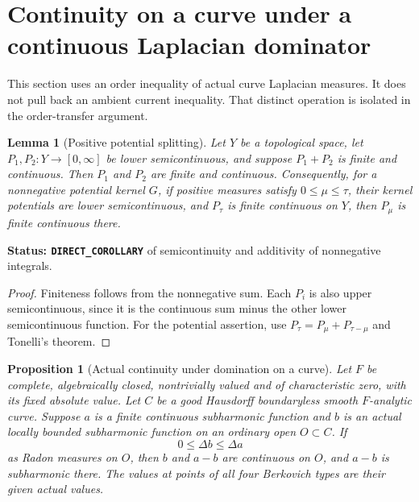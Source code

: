 \documentclass[11pt,a4paper]{article}
\numberwithin{equation}{section}
\newtheorem{lemma}[theorem]{Lemma}
\newtheorem{proposition}[theorem]{Proposition}
\theoremstyle{definition}
\theoremstyle{remark}
\begin{document}


\section{Continuity on a curve under a continuous Laplacian dominator}
\label{sec:r6-curve-order-continuity}

This section uses an order inequality of actual curve Laplacian
measures. It does not pull back an ambient current inequality.
That distinct operation is isolated in the order-transfer argument.

\begin{lemma}[Positive potential splitting]
\label{lem:r6-positive-potential-splitting}
Let $Y$ be a topological space, let $P_1,P_2:Y\to[0,\infty]$
be lower semicontinuous, and suppose $P_1+P_2$ is finite and
continuous. Then $P_1$ and $P_2$ are finite and continuous.
Consequently, for a nonnegative potential kernel $G$, if positive
measures satisfy $0\le\mu\le\tau$, their kernel potentials are
lower semicontinuous, and $P_\tau$ is finite continuous on $Y$,
then $P_\mu$ is finite continuous there.
\end{lemma}

\noindent\textbf{Status: \texttt{DIRECT\_COROLLARY}} of
semicontinuity and additivity of nonnegative integrals.

\begin{proof}
Finiteness follows from the nonnegative sum. Each $P_i$ is also
upper semicontinuous, since it is the continuous sum minus the
other lower semicontinuous function. For the potential assertion,
use $P_\tau=P_\mu+P_{\tau-\mu}$ and Tonelli's theorem.
\end{proof}

\begin{proposition}[Actual continuity under domination on a curve]
\label{prop:r6-curve-continuous-laplacian-dominator}
Let $F$ be complete, algebraically closed, nontrivially valued and
of characteristic zero, with its fixed absolute value. Let $C$ be
a good Hausdorff boundaryless smooth $F$-analytic curve. Suppose
$a$ is a finite continuous subharmonic function and $b$ is an
actual locally bounded subharmonic function on an ordinary open
$O\subset C$. If
\[
                         0\le\Delta b\le\Delta a
\]
as Radon measures on $O$, then $b$ and $a-b$ are continuous on
$O$, and $a-b$ is subharmonic there. The values at points of
all four Berkovich types are their given actual values.
\end{proposition}
\end{document}
